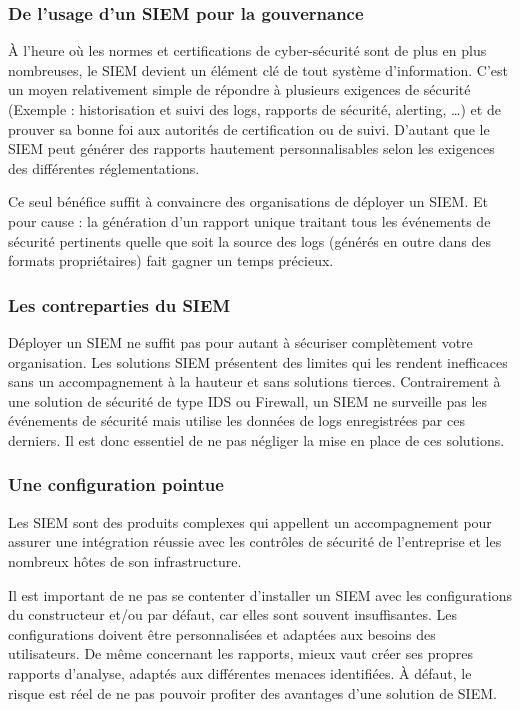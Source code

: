 \subsubsection {De l'usage d'un SIEM pour la gouvernance}  

À l’heure où les normes et certifications de cyber-sécurité sont de plus en plus nombreuses, le SIEM devient un élément clé de tout système d’information. C’est un moyen relativement simple de répondre à plusieurs exigences de sécurité (Exemple : historisation et suivi des logs, rapports de sécurité, alerting, …) et de prouver sa bonne foi aux autorités de certification ou de suivi. D’autant que le SIEM peut générer des rapports hautement personnalisables selon les exigences des différentes réglementations. 

Ce seul bénéfice suffit à convaincre des organisations de déployer un SIEM. Et pour cause : la génération d’un rapport unique traitant tous les événements de sécurité pertinents quelle que soit la source des logs (générés en outre dans des formats propriétaires) fait gagner un temps précieux. 


\subsubsection{Les contreparties du SIEM}
Déployer un SIEM ne suffit pas pour autant à sécuriser complètement votre organisation. Les solutions SIEM présentent des limites qui les rendent inefficaces sans un accompagnement à la hauteur et sans solutions tierces. Contrairement à une solution de sécurité de type IDS ou Firewall, un SIEM ne surveille pas les événements de sécurité mais utilise les données de logs enregistrées par ces derniers. Il est donc essentiel de ne pas négliger la mise en place de ces solutions. 


\subsubsection{Une configuration pointue }
Les SIEM sont des produits complexes qui appellent un accompagnement pour assurer une intégration réussie avec les contrôles de sécurité de l’entreprise et les nombreux hôtes de son infrastructure. 

Il est important de ne pas se contenter d’installer un SIEM avec les configurations du constructeur et/ou par défaut, car elles sont souvent insuffisantes. Les configurations doivent être personnalisées et adaptées aux besoins des utilisateurs. De même concernant les rapports, mieux vaut créer ses propres rapports d’analyse, adaptés aux différentes menaces identifiées. À défaut, le risque est réel de ne pas pouvoir profiter des avantages d’une solution de SIEM. 

